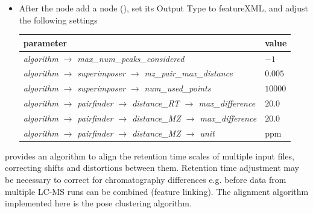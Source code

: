 \begin{itemize}
\item
After the  node add a  node (), set its Output Type to featureXML, and adjust the following settings


\begin{center}
\begin{tabular}{l|l}
\textbf{parameter} & \textbf{value} \\ \hline
\textit{algorithm $\rightarrow$ max\_num\_peaks\_considered} & $-1$ \\
\textit{algorithm $\rightarrow$ superimposer $\rightarrow$ mz\_pair\_max\_distance} & $0.005$ \\
\textit{algorithm $\rightarrow$ superimposer $\rightarrow$ num\_used\_points} & $10000$ \\
\textit{algorithm $\rightarrow$ pairfinder $\rightarrow$ distance\_RT $\rightarrow$ max\_difference} & $20.0$ \\
\textit{algorithm $\rightarrow$ pairfinder $\rightarrow$ distance\_MZ $\rightarrow$ max\_difference} & $20.0$ \\
\textit{algorithm $\rightarrow$ pairfinder $\rightarrow$ distance\_MZ $\rightarrow$ unit} & ppm
\end{tabular}
\end{center}

\end{itemize}

\noindent {} provides an algorithm to align the retention time scales of multiple input files, correcting shifts and distortions between them. Retention time adjustment may be necessary to correct for chromatography differences e.g. before data from multiple LC-MS runs can be combined (feature linking). The alignment algorithm implemented here is the pose clustering algorithm. \\

